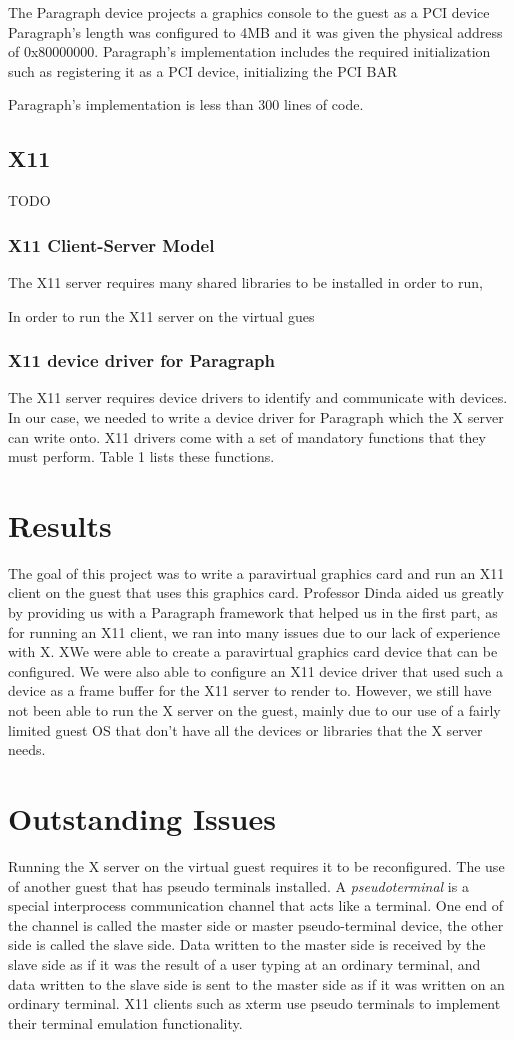 \documentclass{acm_proc_article-sp}
\begin{document}
The Paragraph device projects a graphics console to the guest as a PCI device
Paragraph's length was configured to 4MB and it was given the physical address
of 0x80000000. Paragraph's implementation includes the required initialization
such as registering it as a PCI device, initializing the PCI BAR

Paragraph's implementation is less than 300 lines of code.

\subsection{X11}
 TODO
\subsubsection{X11 Client\--Server Model}
The X11 server requires many shared libraries to be installed in order to run,

 In order to run the X11 server on the virtual gues
\subsubsection{X11 device driver for Paragraph}
The X11 server requires device drivers to identify and communicate with devices.
In our case, we needed to write a device driver for Paragraph which the X server can
write onto.
X11 drivers come with a set of mandatory functions that they must perform. Table
1 lists these functions.
\section{Results}
The goal of this project was to write a paravirtual graphics card and run an X11
client on the guest that uses this graphics card. Professor Dinda aided us
greatly by providing us with a Paragraph framework that helped us in the first
part, as for running an X11 client, we ran into many issues due to our lack of
experience with X. XWe were able to create a paravirtual graphics card device
that can be configured. 
We were also able to configure an X11 device driver that used such a device as a
frame buffer for the X11 server to render to. However, we still have not been able to run
the X server on the guest, mainly due to our use of a fairly limited guest OS
that don't have all the devices or libraries that the X server needs.
\section{Outstanding Issues}
Running the X server on the virtual guest requires it to be reconfigured. The
use of another guest that has pseudo terminals installed. A
\textit{pseudo\textunderscore terminal} is a special interprocess communication
channel that acts like a terminal. One end of the channel is called the master side or master pseudo-terminal device, 
the other side is called the slave side. 
Data written to the master side is received by the slave side as if it was the result of a user typing at an ordinary terminal, 
and data written to the slave side is sent to the master side as if it was written on an ordinary terminal.
X11 clients such as xterm use pseudo terminals to implement their terminal emulation functionality.
\end{document}

